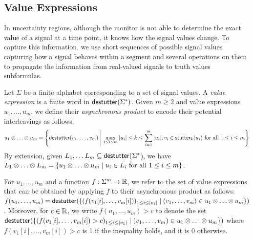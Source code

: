 \subsection{Value Expressions}
In uncertainty regions, although the monitor is not able to determine the exact value of a signal at a time point, it knows how the signal values change.
To capture this information, we use short sequences of possible signal values capturing how a signal behaves within a segment and several operations on them to propagate the information from real-valued signals to truth values subformulas.

Let $\Sigma$ be a finite alphabet corresponding to a set of signal values.
A \emph{value expression} is a finite word in $\mathsf{destutter}(\Sigma^*)$.
Given $m \geq 2$ and value expressions $u_1, \ldots, u_m$, we define their \emph{asynchronous product} to encode their potential interleavings as follows:
\small
$$u_1 \otimes \ldots \otimes u_m = \left\lbrace  \destutter(v_1, \ldots, v_m) \st \max_{1 \leq i \leq m} |u_i| \leq k \leq \sum_{i = 1}^{m} |u_i|, v_i \in \stutter_k(u_i) \text{ for all } 1 \leq i \leq m \right\rbrace$$  
\normalsize
By extension, given $L_1, \ldots L_m \subseteq \mathsf{destutter}(\Sigma^*$), we have $L_1 \otimes \ldots \otimes L_m = \{ u_1 \otimes \ldots \otimes u_m \st u_i \in L_i \text{ for all } 1 \leq i \leq m\}$.


For $u_1, \ldots, u_m$ and a function $f : \Sigma^m \to \mathbb{R}$, we refer to the set of value expressions that can be obtained by applying $f$ to their asynchronous product as follows: $f(u_1, \ldots, u_m) = \destutter(\{(f(v_1[i], \ldots, v_m[i]))_{1 \leq i \leq |v_1|} \st (v_1, \ldots, v_m) \in u_1 \otimes \ldots \otimes u_m\})$.
Moreover, for $c \in \mathbb{R}$, we write $f(u_1, \ldots, u_m) > c$ to denote the set $\destutter(\{(f(v_1[i], \ldots, v_m[i]) > c)_{1 \leq i \leq |v_1|} \st (v_1, \ldots, v_m) \in u_1 \otimes \ldots \otimes u_m\})$ where $f(v_1[i], \ldots, v_m[i]) > c$ is 1 if the inequality holds, and it is 0 otherwise.

